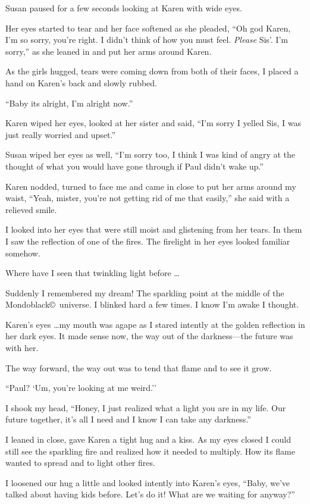 Susan paused for a few seconds looking at Karen with wide eyes.

Her eyes started to tear and her face softened as she pleaded, ``Oh
god Karen, I'm so sorry, you're right. I didn't think of how you
must feel. \emph{Please} Sis'. I'm sorry,'' as she leaned in and
put her arms around Karen.

As the girls hugged, tears were coming down from both of their faces,
I placed a hand on Karen's back and slowly rubbed.

``Baby its alright, I'm alright now.''

Karen wiped her eyes, looked at her sister and said, ``I'm sorry
I yelled Sis, I was just really worried and upset.''

Susan wiped her eyes as well, ``I'm sorry too, I think I was
kind of angry at the thought of what you would have gone through
if Paul didn't wake up.''

Karen nodded, turned to face me and came in close to put her
arms around my waist, ``Yeah, mister, you're not getting rid of
me that easily,'' she said with a relieved smile.

I looked into her eyes that were still moist and glistening from
her tears.  In them I saw the reflection of one of the
fires. The firelight in her eyes looked familiar somehow.

Where have I seen that twinkling light before \ldots

Suddenly I remembered my dream! The sparkling point at
the middle of the Mondoblack\copyright\ universe. I blinked hard
a few times. I know I'm awake I thought.

Karen's eyes \ldots my mouth was agape as I stared intently at
the golden reflection in her dark eyes. It made sense now,
the way out of the darkness---the future was with her.

The way forward, the way out was to tend that flame and to see it grow.

``Paul?  `Um, you're looking at me weird.''

I shook my head,  ``Honey, I
just realized what a light you are in my life.  Our
future together, it's all I need and I know I can take any darkness.''

I leaned in close, gave Karen a tight hug and a kiss. As my eyes
closed I could still see the sparkling fire and
realized how it needed to multiply. How its flame wanted to spread and
to light other fires.

I loosened our hug a little and looked intently into Karen's
eyes, ``Baby, we've talked about having kids before. Let's do it! What
are we waiting for anyway?''

